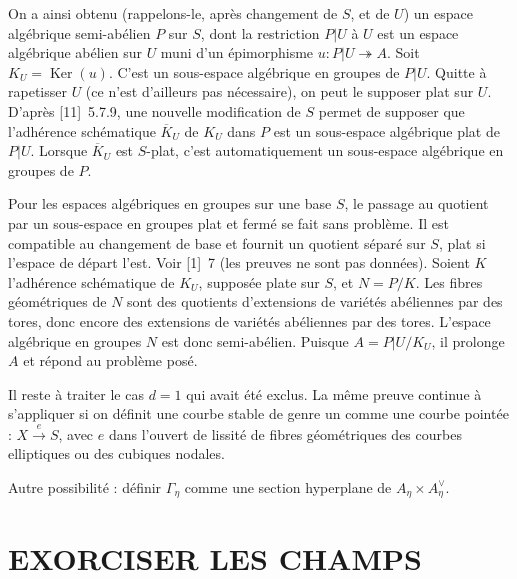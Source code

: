 \documentclass[12pt,a4paper]{article}
\theoremstyle{plain}
\theoremstyle{definition}
\theoremstyle{remark}
\DeclareMathOperator{\Ker}{Ker}
\begin{document}
On a ainsi obtenu (rappelons-le, après changement de $S$, et de $U$) un espace algébrique semi-abélien $P$ sur $S$, dont la restriction $P|U$ à $U$ est un espace algébrique abélien sur $U$ muni d'un épimorphisme $u : P|U \twoheadrightarrow A$. Soit $K_U = \Ker(u)$. C'est un sous-espace algébrique en groupes de $P|U$. Quitte à rapetisser $U$ (ce n'est d'ailleurs pas nécessaire), on peut le supposer plat sur $U$. D'après [11]~5.7.9, une nouvelle modification de $S$ permet de supposer que l'adhérence schématique $\overline{K}_U$ de $K_U$ dans $P$ est un sous-espace algébrique plat de $P|U$. Lorsque $\overline{K}_U$ est $S$-plat, c'est automatiquement un sous-espace algébrique en groupes de $P$.

Pour les espaces algébriques en groupes sur une base $S$, le passage au quotient par un sous-espace en groupes plat et fermé se fait sans problème. Il est compatible au changement de base et fournit un quotient séparé sur $S$, plat si l'espace de départ l'est. Voir [1]~7 (les preuves ne sont pas données). Soient $K$ l'adhérence schématique de $K_U$, supposée plate sur $S$, et $N = P/K$. Les fibres géométriques de $N$ sont des quotients d'extensions de variétés abéliennes par des tores, donc encore des extensions de variétés abéliennes par des tores. L'espace algébrique en groupes $N$ est donc semi-abélien. Puisque $A = P|U/K_U$, il prolonge $A$ et répond au problème posé.

Il reste à traiter le cas $d = 1$ qui avait été exclus. La même preuve continue à s'appliquer si on définit une courbe stable de genre un comme une courbe pointée : $X \xrightarrow{e} S$, avec $e$ dans l'ouvert de lissité de fibres géométriques des courbes elliptiques ou des cubiques nodales.

Autre possibilité : définir $\Gamma_\eta$ comme une section hyperplane de $A_\eta \times A_\eta^\vee$.


\section{EXORCISER LES CHAMPS}
\end{document}
